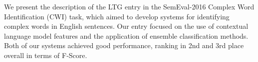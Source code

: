 We present the description of the LTG entry in the SemEval-2016 Complex Word Identification (CWI) task, which aimed to develop systems for identifying complex words in English sentences. Our entry focused on the use of contextual language model features and the application of ensemble classification methods. Both of our systems achieved good performance, ranking in 2nd and 3rd place overall in terms of F-Score.
